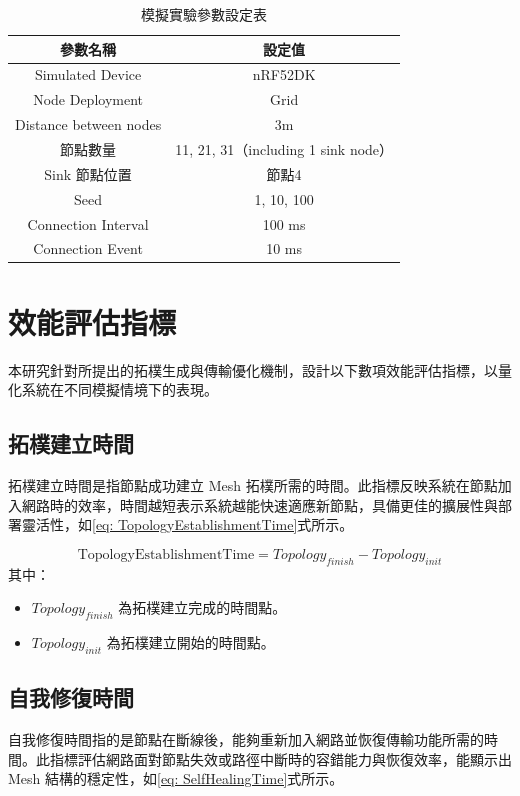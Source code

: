 \begin{ZhChapter}
\begin{table}[H]
    \centering
    \caption{模擬實驗參數設定表}
    \label{tab: 模擬實驗參數設定表}
    \begin{tabular}{|c|c|}
        \hline
        參數名稱 & 設定值 \\
        \hline
        Simulated Device & nRF52DK \\
        \hline
        Node Deployment & Grid \\
        \hline
        Distance between nodes & 3m \\
        \hline
        節點數量 & 11, 21, 31（including 1 sink node） \\
        \hline
        Sink 節點位置 & 節點4 \\
        \hline
        Seed & 1, 10, 100 \\
        \hline
        Connection Interval & 100 ms \\
        \hline
        Connection Event &  10 ms  \\
        \hline
    \end{tabular}
\end{table}

\section{效能評估指標}
本研究針對所提出的拓樸生成與傳輸優化機制，設計以下數項效能評估指標，以量化系統在不同模擬情境下的表現。

\subsection{拓樸建立時間}
拓樸建立時間是指節點成功建立 Mesh 拓樸所需的時間。此指標反映系統在節點加入網路時的效率，時間越短表示系統越能快速適應新節點，具備更佳的擴展性與部署靈活性，如\ref{eq: TopologyEstablishmentTime}式所示。

\begin{equation}
\label{eq: TopologyEstablishmentTime}
\text{TopologyEstablishmentTime} = Topology_{finish} - Topology_{init}
\end{equation}
其中：
\begin{itemize}
    \item $Topology_{finish}$ 為拓樸建立完成的時間點。
    \item $Topology_{init}$ 為拓樸建立開始的時間點。
\end{itemize}

\subsection{自我修復時間}
自我修復時間指的是節點在斷線後，能夠重新加入網路並恢復傳輸功能所需的時間。此指標評估網路面對節點失效或路徑中斷時的容錯能力與恢復效率，能顯示出 Mesh 結構的穩定性，如\ref{eq: SelfHealingTime}式所示。


\end{ZhChapter}
